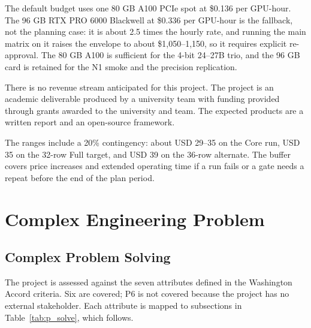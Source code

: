 The default budget uses one 80 GB A100 PCIe spot at \$0.136 per GPU-hour. The 96 GB RTX PRO 6000 Blackwell at \$0.336 per GPU-hour is the fallback, not the planning case: it is about 2.5 times the hourly rate, and running the main matrix on it raises the envelope to about \$1,050--1,150, so it requires explicit re-approval. The 80 GB A100 is sufficient for the 4-bit 24--27B trio, and the 96 GB card is retained for the N1 smoke and the precision replication.

There is no revenue stream anticipated for this project. The project is an academic deliverable produced by a university team with funding provided through grants awarded to the university and team. The expected products are a written report and an open-source framework.

The ranges include a 20\% contingency: about USD 29--35 on the Core run, USD 35 on the 32-row Full target, and USD 39 on the 36-row alternate. The buffer covers price increases and extended operating time if a run fails or a gate needs a repeat before the end of the plan period.


\section{Complex Engineering Problem}

\subsection{Complex Problem Solving}

The project is assessed against the seven attributes defined in the Washington Accord criteria. Six are covered; P6 is not covered because the project has no external stakeholder. Each attribute is mapped to subsections in Table~\ref{tab:p_solve}, which follows.

